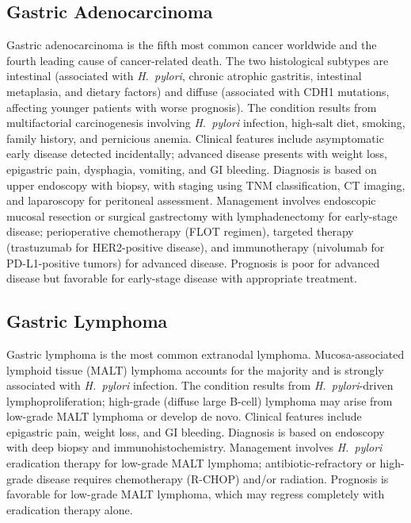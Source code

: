 


\label{sec:Gastric Neoplasms}

\subsection{Gastric Adenocarcinoma}
\label{sec:Gastric Adenocarcinoma}
Gastric adenocarcinoma is the fifth most common cancer worldwide and the fourth leading cause of cancer-related death. The two histological subtypes are intestinal (associated with \textit{H.~pylori}, chronic atrophic gastritis, intestinal metaplasia, and dietary factors) and diffuse (associated with CDH1 mutations, affecting younger patients with worse prognosis). The condition results from multifactorial carcinogenesis involving \textit{H.~pylori} infection, high-salt diet, smoking, family history, and pernicious anemia. Clinical features include asymptomatic early disease detected incidentally; advanced disease presents with weight loss, epigastric pain, dysphagia, vomiting, and GI bleeding. Diagnosis is based on upper endoscopy with biopsy, with staging using TNM classification, CT imaging, and laparoscopy for peritoneal assessment. Management involves endoscopic mucosal resection or surgical gastrectomy with lymphadenectomy for early-stage disease; perioperative chemotherapy (FLOT regimen), targeted therapy (trastuzumab for HER2-positive disease), and immunotherapy (nivolumab for PD-L1-positive tumors) for advanced disease. Prognosis is poor for advanced disease but favorable for early-stage disease with appropriate treatment.

\subsection{Gastric Lymphoma}
\label{sec:Gastric Lymphoma}
Gastric lymphoma is the most common extranodal lymphoma. Mucosa-associated lymphoid tissue (MALT) lymphoma accounts for the majority and is strongly associated with \textit{H.~pylori} infection. The condition results from \textit{H.~pylori}-driven lymphoproliferation; high-grade (diffuse large B-cell) lymphoma may arise from low-grade MALT lymphoma or develop de novo. Clinical features include epigastric pain, weight loss, and GI bleeding. Diagnosis is based on endoscopy with deep biopsy and immunohistochemistry. Management involves \textit{H.~pylori} eradication therapy for low-grade MALT lymphoma; antibiotic-refractory or high-grade disease requires chemotherapy (R-CHOP) and/or radiation. Prognosis is favorable for low-grade MALT lymphoma, which may regress completely with eradication therapy alone.


